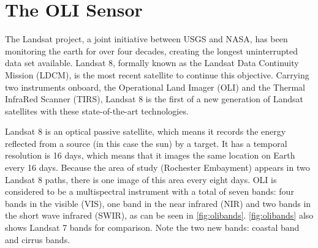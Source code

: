 




\section{The OLI Sensor}
The Landsat project, a joint initiative between USGS and NASA, has been monitoring the earth for over four decades, creating the longest uninterrupted data set available. Landsat 8, formally known as the Landsat Data Continuity Mission (LDCM), is the most recent satellite to continue this objective. Carrying two instruments onboard, the Operational Land Imager (OLI) and the Thermal InfraRed Scanner (TIRS), Landsat 8 is the first of a new generation of Landsat satellites with these state-of-the-art technologies. 

Landsat 8 is an optical passive satellite, which means it records the energy reflected from a source (in this case the sun) by a target. It has a temporal resolution is 16 days, which means that it images the same location on Earth every 16 days. Because the area of study (Rochester Embayment) appears in two Landsat 8 paths, there is one image of this area every eight days. OLI is considered to be a multispectral instrument with a total of seven bands: four bands in the visible (VIS), one band in the near infrared (NIR) and two bands in the short wave infrared (SWIR), as can be seen in \autoref{fig:olibands}. \autoref{fig:olibands} also shows Landsat 7 bands for comparison. Note the two new bands: coastal band and cirrus bands.

